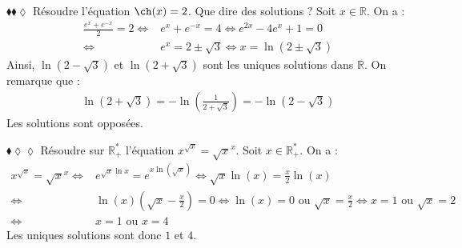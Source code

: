 \documentclass[11pt]{article}
\begin{document}
\begin{exercice}{$\blacklozenge\blacklozenge\lozenge$}{}
    Résoudre l'équation $\ch(x)=2$. Que dire des solutions ?
    \tcblower
    Soit $x\in\mathbb{R}$. On a :
    \begin{align*}
        \frac{e^x+e^{-x}}{2}=2
        \iff&e^x+e^{-x}=4
        \iff e^{2x}-4e^x+1=0\\
        \iff&e^x=2\pm\sqrt{3}
        \iff x=\ln(2\pm\sqrt{3})
    \end{align*}
    Ainsi, $\ln(2-\sqrt{3})$ et $\ln(2+\sqrt{3})$ sont les uniques solutions dans $\mathbb{R}$. On remarque que :
    \begin{align*}
        \ln(2+\sqrt{3})=-\ln\left(\frac{1}{2+\sqrt{3}}\right)=-\ln\left(2-\sqrt{3}\right)
    \end{align*}
    Les solutions sont opposées.
\end{exercice}

\begin{exercice}{$\blacklozenge\lozenge\lozenge$}{}
    Résoudre sur $\mathbb{R}^*_+$ l'équation $x^{\sqrt{x}}=\sqrt{x}^x$. 
    \tcblower
    Soit $x\in\mathbb{R}^*_+$. On a :
    \begin{align*}
        x^{\sqrt{x}}=\sqrt{x}^x
        \iff&e^{\sqrt{x}\ln{x}}=e^{x\ln(\sqrt{x})}
        \iff \sqrt{x}\ln(x)=\frac{x}{2}\ln(x)\\
        \iff&\ln(x)(\sqrt{x}-\frac{x}{2})=0
        \iff \ln(x)=0\text{ ou } \sqrt{x}=\frac{x}{2}
        \iff x=1\text{ ou }\sqrt{x}=2\\
        \iff&x=1\text{ ou }x=4
    \end{align*}
    Les uniques solutions sont donc $1$ et $4$.
\end{exercice}
\end{document}

